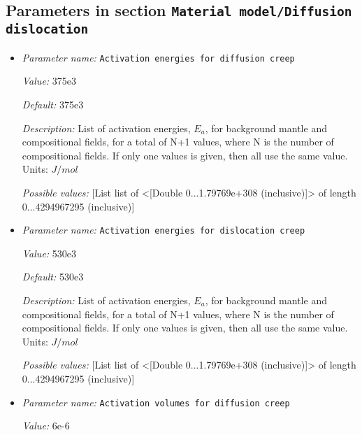 \subsection{Parameters in section \tt Material model/Diffusion dislocation}
\label{parameters:Material_20model/Diffusion_20dislocation}

\begin{itemize}
\item {\it Parameter name:} {\tt Activation energies for diffusion creep}
\label{parameters:Material model/Diffusion dislocation/Activation energies for diffusion creep}


{\it Value:} 375e3


{\it Default:} 375e3


{\it Description:} List of activation energies, $E_a$, for background mantle and compositional fields, for a total of N+1 values, where N is the number of compositional fields. If only one values is given, then all use the same value.  Units: $J / mol$


{\it Possible values:} [List list of <[Double 0...1.79769e+308 (inclusive)]> of length 0...4294967295 (inclusive)]
\item {\it Parameter name:} {\tt Activation energies for dislocation creep}
\label{parameters:Material model/Diffusion dislocation/Activation energies for dislocation creep}


{\it Value:} 530e3


{\it Default:} 530e3


{\it Description:} List of activation energies, $E_a$, for background mantle and compositional fields, for a total of N+1 values, where N is the number of compositional fields. If only one values is given, then all use the same value.  Units: $J / mol$


{\it Possible values:} [List list of <[Double 0...1.79769e+308 (inclusive)]> of length 0...4294967295 (inclusive)]
\item {\it Parameter name:} {\tt Activation volumes for diffusion creep}
\label{parameters:Material model/Diffusion dislocation/Activation volumes for diffusion creep}


{\it Value:} 6e-6



\end{itemize}
